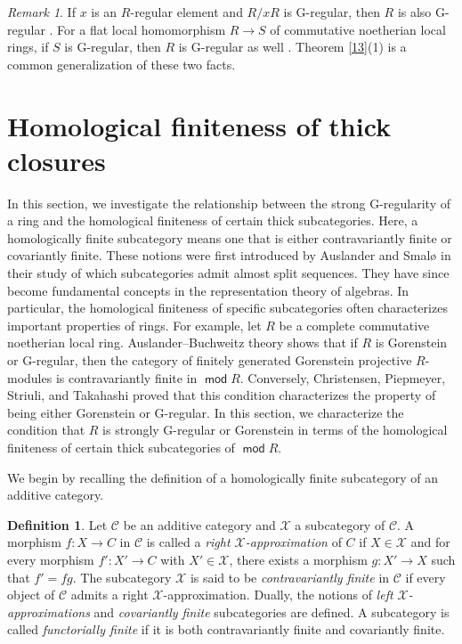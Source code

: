 \documentclass{amsart}
\theoremstyle{definition}
\newtheorem{dfn}[thm]{Definition}
\theoremstyle{remark}
\newtheorem{rem}[thm]{Remark}
\numberwithin{equation}{thm}
\def\C{\mathcal{C}}
\def\mod{\operatorname{\mathsf{mod}}}
\def\X{\mathcal{X}}
\begin{document}
\begin{rem}
If $x$ is an $R$-regular element and $R/xR$ is G-regular, then $R$ is also G-regular \cite[Proposition 4.1]{T08}.
For a flat local homomorphism $R\to S$ of commutative noetherian local rings, if $S$ is G-regular, then $R$ is G-regular as well \cite[Proposition 4.2]{T08}.
Theorem \ref{13}(1) is a common generalization of these two facts.
\end{rem}

\section{Homological finiteness of thick closures}

In this section, we investigate the relationship between the strong G-regularity of a ring and the homological finiteness of certain thick subcategories.
Here, a homologically finite subcategory means one that is either contravariantly finite or covariantly finite.
These notions were first introduced by Auslander and Smal{\o} \cite{AS} in their study of which subcategories admit almost split sequences. They have since become fundamental concepts in the representation theory of algebras.
In particular, the homological finiteness of specific subcategories often characterizes important properties of rings.
For example, let $R$ be a complete commutative noetherian local ring. Auslander--Buchweitz theory \cite{AB} shows that if $R$ is Gorenstein or G-regular, then the category of finitely generated Gorenstein projective $R$-modules is contravariantly finite in $\mod R$.
Conversely, Christensen, Piepmeyer, Striuli, and Takahashi \cite{CPST08} proved that this condition characterizes the property of being either Gorenstein or G-regular.
In this section, we characterize the condition that $R$ is strongly G-regular or Gorenstein in terms of the homological finiteness of certain thick subcategories of $\mod R$.

We begin by recalling the definition of a homologically finite subcategory of an additive category.

\begin{dfn}
Let $\C$ be an additive category and $\X$ a subcategory of $\C$.
A morphism $f:X\to C$ in $\C$ is called a \textit{right $\X$-approximation} of $C$ if $X\in\X$ and for every morphism $f':X'\to C$ with $X'\in\X$, there exists a morphism $g:X'\to X$ such that $f'=fg$.
The subcategory $\X$ is said to be \textit{contravariantly finite} in $\C$ if every object of $\C$ admits a right $\X$-approximation.
Dually, the notions of \textit{left $\X$-approximations} and \textit{covariantly finite} subcategories are defined.
A subcategory is called \textit{functorially finite} if it is both contravariantly finite and covariantly finite.
\end{dfn}
\end{document}
